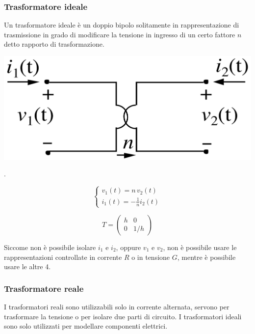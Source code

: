 \documentclass[a4paper]{article}
\begin{document}
\subsubsection*{Trasformatore ideale}
Un trasformatore ideale è un doppio bipolo solitamente in rappresentazione di trasmissione in grado di modificare la tensione
in ingresso di un certo fattore \(n\) detto rapporto di trasformazione.

\begin{center}
	\begin{minipage}{0.3\textwidth}
		\centering
		\includegraphics[width=\textwidth]{immagini/trasformatore.png}
	\end{minipage}
	\begin{minipage}{0.07\textwidth}
		\(\big.\)
	\end{minipage}
	\begin{minipage}{0.3\textwidth}
		\[\begin{cases}
			\displaystyle v_1(t) = n \, v_2(t) \\[7pt]
			\displaystyle i_1(t) = -\frac{1}{n} i_2(t)
		\end{cases}\]
	\end{minipage}
	\begin{minipage}{0.25\textwidth}
		\[T = \left(\begin{matrix}
			h & 0 \\ 0 & 1/h
		\end{matrix}\right)\]
	\end{minipage}
\end{center}
Siccome non è possibile isolare \(i_1\) e \(i_2\), oppure \(v_1\) e \(v_2\), non è possibile usare le rappresentazioni controllate
in corrente \(R\) o in tensione \(G\), mentre è possibile usare le altre 4.

\subsubsection*{Trasformatore reale}
I trasformatori reali sono utilizzabili solo in corrente alternata, servono per trasformare la tensione o per isolare due parti
di circuito. I trasformatori ideali sono solo utilizzati per modellare componenti elettrici.
\end{document}
